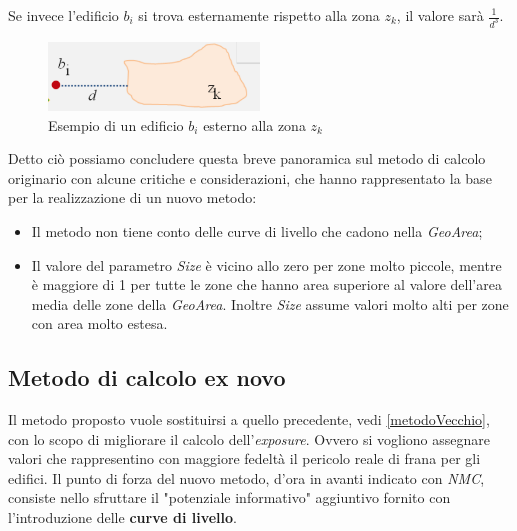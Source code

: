 \begin{enumerate}
Se invece l'edificio $b_i$ si trova esternamente rispetto alla zona $z_k$, il valore sarà $\frac{1}{d^3}$.

\begin{figure}[bth]
  \label{fig:stazDentro}
  \centering
    \includegraphics[width=0.5\textwidth]{img/stazFuori}
      \caption{Esempio di un edificio $b_i$ esterno alla zona                    $z_k$}
\end{figure}
\end{enumerate}

Detto ciò possiamo concludere questa breve panoramica sul metodo di calcolo originario con alcune critiche e considerazioni, che hanno rappresentato la base per la realizzazione di un nuovo metodo:
\begin{itemize}
\label{controMetodoVecchio}
\item Il metodo non tiene conto delle curve di livello che cadono nella \textit{GeoArea};
\item Il valore del parametro \textit{Size} è vicino allo zero per zone molto piccole, mentre è maggiore di 1 per tutte le zone che hanno area superiore al valore dell’area media delle zone della \textit{GeoArea}. Inoltre \textit{Size} assume valori molto alti per zone con area molto estesa.
\end{itemize}


\subsection{Metodo di calcolo ex novo}
\label{metodoNuovo}
Il metodo proposto vuole sostituirsi a quello precedente, vedi \ref{metodoVecchio}, con lo scopo di migliorare il calcolo dell'\textit{exposure}. Ovvero si vogliono assegnare valori che rappresentino con maggiore fedeltà il pericolo reale di frana per gli edifici. 
Il punto di forza del nuovo metodo, d'ora in avanti indicato con \textit{NMC}, consiste nello sfruttare il "potenziale informativo" aggiuntivo fornito con l'introduzione delle \textbf{curve di livello}. \newline




